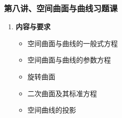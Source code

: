 
\begin{frame}
	\frametitle{第八讲、空间曲面与曲线习题课}
	\linespread{1.5}
	\begin{enumerate}
	  \item {\bf 内容与要求}%
	  \begin{itemize}
	    \item 空间曲面与曲线的一般式方程
	    \item 空间曲面与曲线的参数方程
	    \item 旋转曲面
	    \item 二次曲面及其标准方程
	    \item 空间曲线的投影
	  \vspace{1em}
	  \end{itemize}
	\end{enumerate}
\end{frame}


